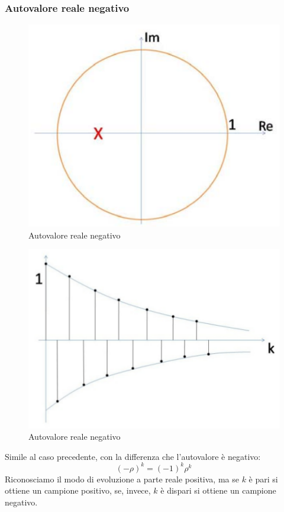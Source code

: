 \documentclass[a4paper]{report}
\begin{document}
\subsubsection{Autovalore reale negativo}
\begin{figure}[!h]
  \begin{center}
    \includegraphics[scale=0.3]{./figures/autovaloreRealeNegativo00.png}
    \caption{Autovalore reale
      negativo}\label{fig:autovaloreRealeNegativo00.png} 
  \end{center}
\end{figure}
\begin{figure}[!h]
  \begin{center}
    \includegraphics[scale=0.3]{./figures/autovaloreRealeNegativo01.png}
    \caption{Autovalore reale
      negativo}\label{fig:autovaloreRealeNegativo01.png} 
  \end{center}
\end{figure}
Simile al caso precedente, con la differenza che l'autovalore \`e
negativo:
\[
(- \rho)^k = (-1)^k \rho^k
\]
Riconosciamo il modo di evoluzione a parte reale positiva, ma se $k$
\`e pari si ottiene un campione positivo, se, invece, $k$ \`e
dispari si ottiene un campione negativo.
\end{document}
